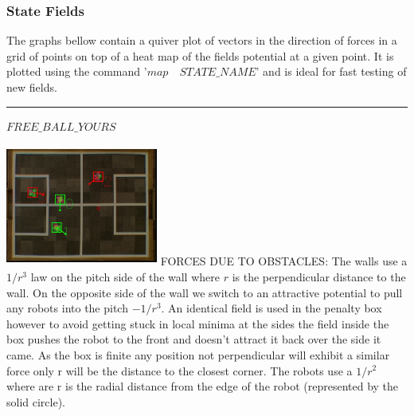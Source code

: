 \documentclass[a4paper,12pt]{article}
\begin{document}
\subsubsection{State Fields}

The graphs bellow contain a quiver plot of vectors in the direction of forces in a grid of points on top of a heat map of the fields potential at a given point. It is plotted using the command '$map\quad STATE\_NAME$' and is ideal for fast testing of new fields.\newline\newline
\rule{\textwidth}{1pt}\newline
$FREE\_BALL\_YOURS$ \newline \newline
\begin{minipage}{0.5\textwidth}
\includegraphics[height=40mm,width=50mm]{v3.jpg}\newline\newline
FORCES DUE TO OBSTACLES:
The walls use a $1/r^3$ law on the pitch side of the wall where $r$ is the perpendicular distance to the wall. On the opposite side of the wall we switch to an attractive potential to pull any robots into the pitch $-1/r^3$. An identical field is used in the penalty box however to avoid getting stuck in local minima at the sides the field inside the box pushes the robot to the front and doesn't attract it back over the side it came. As the box is finite any position not perpendicular will exhibit a similar force only r will be the distance to the closest corner. The robots use a $1/r^2$ where are r is the radial distance from the edge of the robot (represented by the solid circle).
\end{minipage}
\hspace{.2cm}
\end{document}

